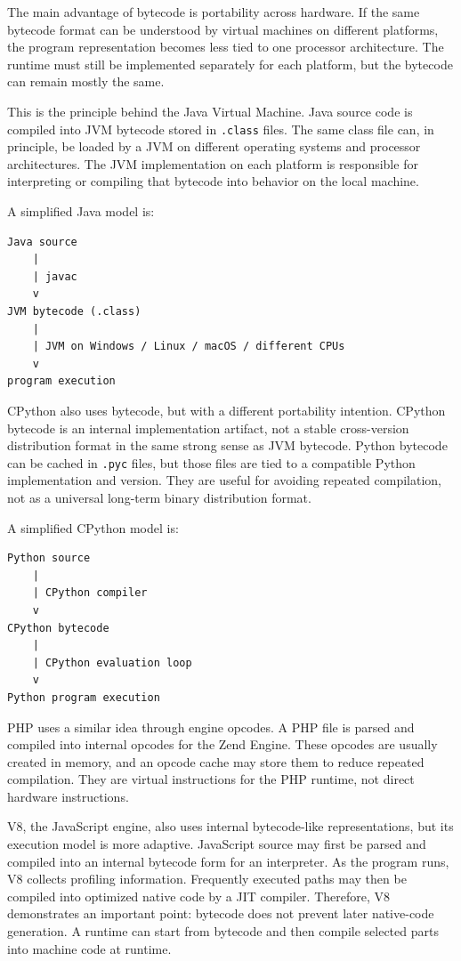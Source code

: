 \documentclass[a4paper,twoside]{report}
\begin{document}
The main advantage of bytecode is portability across hardware. If the same bytecode format can be understood by virtual machines on different platforms, the program representation becomes less tied to one processor architecture. The runtime must still be implemented separately for each platform, but the bytecode can remain mostly the same.

This is the principle behind the Java Virtual Machine. Java source code is compiled into JVM bytecode stored in \texttt{.class} files. The same class file can, in principle, be loaded by a JVM on different operating systems and processor architectures. The JVM implementation on each platform is responsible for interpreting or compiling that bytecode into behavior on the local machine.

A simplified Java model is:

\begin{verbatim}
Java source
    |
    | javac
    v
JVM bytecode (.class)
    |
    | JVM on Windows / Linux / macOS / different CPUs
    v
program execution
\end{verbatim}

CPython also uses bytecode, but with a different portability intention. CPython bytecode is an internal implementation artifact, not a stable cross-version distribution format in the same strong sense as JVM bytecode. Python bytecode can be cached in \texttt{.pyc} files, but those files are tied to a compatible Python implementation and version. They are useful for avoiding repeated compilation, not as a universal long-term binary distribution format.

A simplified CPython model is:

\begin{verbatim}
Python source
    |
    | CPython compiler
    v
CPython bytecode
    |
    | CPython evaluation loop
    v
Python program execution
\end{verbatim}

PHP uses a similar idea through engine opcodes. A PHP file is parsed and compiled into internal opcodes for the Zend Engine. These opcodes are usually created in memory, and an opcode cache may store them to reduce repeated compilation. They are virtual instructions for the PHP runtime, not direct hardware instructions.

V8, the JavaScript engine, also uses internal bytecode-like representations, but its execution model is more adaptive. JavaScript source may first be parsed and compiled into an internal bytecode form for an interpreter. As the program runs, V8 collects profiling information. Frequently executed paths may then be compiled into optimized native code by a JIT compiler. Therefore, V8 demonstrates an important point: bytecode does not prevent later native-code generation. A runtime can start from bytecode and then compile selected parts into machine code at runtime.
\end{document}
